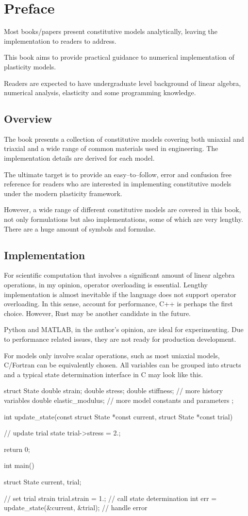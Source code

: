 \chapter{Preface}
Most books/papers present constitutive models analytically, leaving the implementation to readers to address.

This book aims to provide practical guidance to numerical implementation of plasticity models.

Readers are expected to have undergraduate level background of linear algebra, numerical analysis, elasticity and some programming knowledge.
\section{Overview}
The book presents a collection of constitutive models covering both uniaxial and triaxial and a wide range of common materials used in engineering. The implementation details are derived for each model.

The ultimate target is to provide an easy--to--follow, error and confusion free reference for readers who are interested in implementing constitutive models under the modern plasticity framework.

However, a wide range of different constitutive models are covered in this book, not only formulations but also implementations, some of which are very lengthy. There are a huge amount of symbols and formulae.
\section{Implementation}
For scientific computation that involves a significant amount of linear algebra operations, in my opinion, operator overloading is essential. Lengthy implementation is almost inevitable if the language does not support operator overloading. In this sense, account for performance, C++ is perhaps the first choice. However, Rust may be another candidate in the future.

Python and MATLAB, in the author's opinion, are ideal for experimenting. Due to performance related issues, they are not ready for production development.

For models only involve scalar operations, such as most uniaxial models, C/Fortran can be equivalently chosen. All variables can be grouped into structs and a typical state determination interface in C may look like this.
\begin{cppcode}
struct State
{
    double strain;
    double stress;
    double stiffness;
    // more history variables
    double elastic_modulus;
    // more model constants and parameters
};

int update_state(const struct State *const current, struct State *const trial){
    // update trial state
    trial->stress = 2.;

    return 0;
}

int main()
{
    struct State current, trial;

    // set trial strain
    trial.strain = 1.;
    // call state determination
    int err = update_state(&current, &trial);
    // handle error
}
\end{cppcode}

